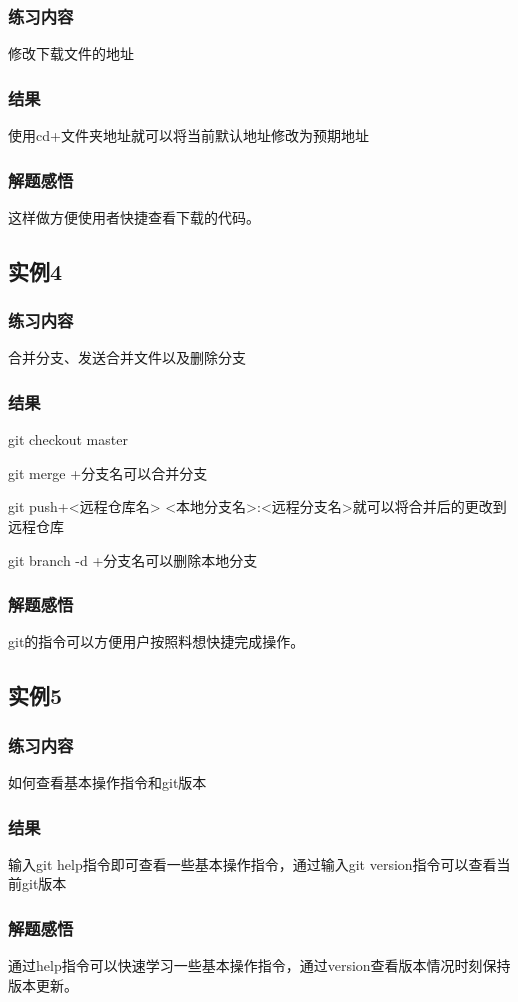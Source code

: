 \documentclass{ctexart}
\begin{document}
\subsubsection{练习内容}
修改下载文件的地址
\subsubsection{结果}
使用cd+文件夹地址就可以将当前默认地址修改为预期地址
\subsubsection{解题感悟}
这样做方便使用者快捷查看下载的代码。
\subsection{实例4}
\subsubsection{练习内容}
合并分支、发送合并文件以及删除分支
\subsubsection{结果}
git checkout master

git merge +分支名可以合并分支

git push+<远程仓库名> <本地分支名>:<远程分支名>就可以将合并后的更改到远程仓库

git branch -d +分支名可以删除本地分支
\subsubsection{解题感悟}
git的指令可以方便用户按照料想快捷完成操作。
\subsection{实例5}
\subsubsection{练习内容}
如何查看基本操作指令和git版本
\subsubsection{结果}
输入git help指令即可查看一些基本操作指令，通过输入git version指令可以查看当前git版本
\subsubsection{解题感悟}
通过help指令可以快速学习一些基本操作指令，通过version查看版本情况时刻保持版本更新。
\end{document}
